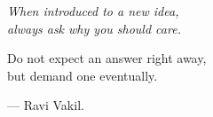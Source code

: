 \begin{minipage}[t]{.5\textwidth}
    \nothing
\end{minipage}
\begin{minipage}[t]{.45\textwidth}
	\itshape
	When introduced to a new idea, \\
	\nothing \quad always ask why you should care.
	
	Do not expect an answer right away, \\
	\nothing \quad but demand one eventually.
	
    \hfill --- Ravi Vakil.
\end{minipage}
